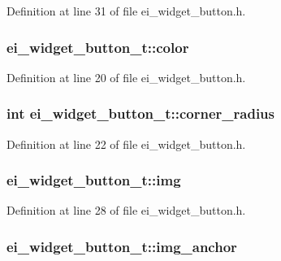 Definition at line 31 of file ei\-\_\-widget\-\_\-button.\-h.

\hypertarget{structei__widget__button__t_a9fb4cdb0541591221c5dcfc88dc869b9}{
\subsubsection[{color}]{ ei\-\_\-widget\-\_\-button\-\_\-t\-::color}}\label{structei__widget__button__t_a9fb4cdb0541591221c5dcfc88dc869b9}


Definition at line 20 of file ei\-\_\-widget\-\_\-button.\-h.

\hypertarget{structei__widget__button__t_a34822359cc6bd4a196b9ccc545441748}{
\subsubsection[{corner\-\_\-radius}]{\setlength{\rightskip}{0pt plus 5cm}int ei\-\_\-widget\-\_\-button\-\_\-t\-::corner\-\_\-radius}}\label{structei__widget__button__t_a34822359cc6bd4a196b9ccc545441748}


Definition at line 22 of file ei\-\_\-widget\-\_\-button.\-h.

\hypertarget{structei__widget__button__t_a6bae8ac3b27a453f7a56299a2ed58ac7}{
\subsubsection[{img}]{ ei\-\_\-widget\-\_\-button\-\_\-t\-::img}}\label{structei__widget__button__t_a6bae8ac3b27a453f7a56299a2ed58ac7}


Definition at line 28 of file ei\-\_\-widget\-\_\-button.\-h.

\hypertarget{structei__widget__button__t_a24dc795533f63d7759d2572b3899ca7c}{
\subsubsection[{img\-\_\-anchor}]{ ei\-\_\-widget\-\_\-button\-\_\-t\-::img\-\_\-anchor}}\label{structei__widget__button__t_a24dc795533f63d7759d2572b3899ca7c}


